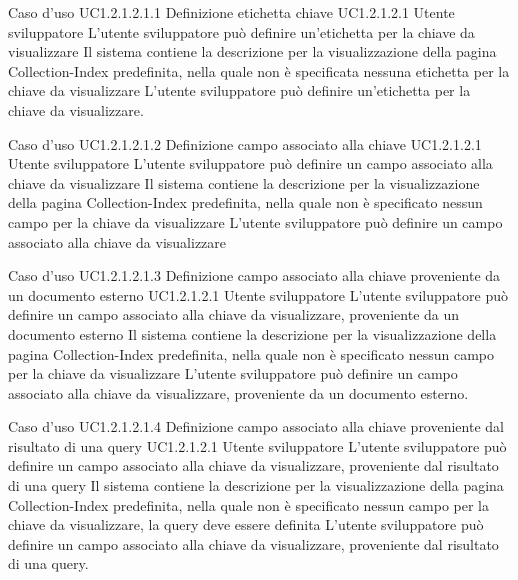\UCtitle
{Caso d'uso UC1.2.1.2.1.1}
{Definizione etichetta chiave}
\UC
{UC1.2.1.2.1}
{Utente sviluppatore}
{L'utente sviluppatore può definire un'etichetta per la chiave da visualizzare}
{Il sistema contiene la descrizione per la visualizzazione della pagina Collection-Index predefinita, nella quale non è specificata nessuna etichetta per la chiave da visualizzare}
\scenario
{L'utente sviluppatore può definire un'etichetta per la chiave da visualizzare.}

\UCtitle
{Caso d'uso UC1.2.1.2.1.2}
{Definizione campo associato alla chiave}
\UC
{UC1.2.1.2.1}
{Utente sviluppatore}
{L'utente sviluppatore può definire un campo associato alla chiave da visualizzare}
{Il sistema contiene la descrizione per la visualizzazione della pagina Collection-Index predefinita, nella quale non è specificato nessun campo per la chiave da visualizzare}
\scenario
{L'utente sviluppatore può definire un campo associato alla chiave da visualizzare}

\UCtitle
{Caso d'uso UC1.2.1.2.1.3}
{Definizione campo associato alla chiave proveniente da un documento esterno}
\UC
{UC1.2.1.2.1}
{Utente sviluppatore}
{L'utente sviluppatore può definire un campo associato alla chiave da visualizzare, proveniente da un documento esterno}
{Il sistema contiene la descrizione per la visualizzazione della pagina Collection-Index predefinita, nella quale non è specificato nessun campo per la chiave da visualizzare}
\scenario
{L'utente sviluppatore può definire un campo associato alla chiave da visualizzare, proveniente da un documento esterno.}

\UCtitle
{Caso d'uso UC1.2.1.2.1.4}
{Definizione campo associato alla chiave proveniente dal risultato di una query}
\UC
{UC1.2.1.2.1}
{Utente sviluppatore}
{L'utente sviluppatore può definire un campo associato alla chiave da visualizzare, proveniente dal risultato di una query}
{Il sistema contiene la descrizione per la visualizzazione della pagina Collection-Index predefinita, nella quale non è specificato nessun campo per la chiave da visualizzare, la query deve essere definita}
\scenario
{L'utente sviluppatore può definire un campo associato alla chiave da visualizzare, proveniente dal risultato di una query.}

